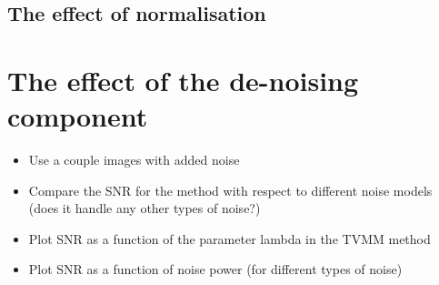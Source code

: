 \documentclass[12pt,twoside,notitlepage]{report}
\begin{document}
        \subsection{The effect of normalisation} \label{sec:effect_of_normalisation}


    \section{The effect of the de-noising component}
        \begin{itemize}
            \item Use a couple images with added noise
            \item Compare the SNR for the method with respect to different noise models (does it handle any other types of noise?)
            \item Plot SNR as a function of the parameter lambda in the TVMM method
            \item Plot SNR as a function of noise power (for different types of noise)
        \end{itemize}




\end{document}
